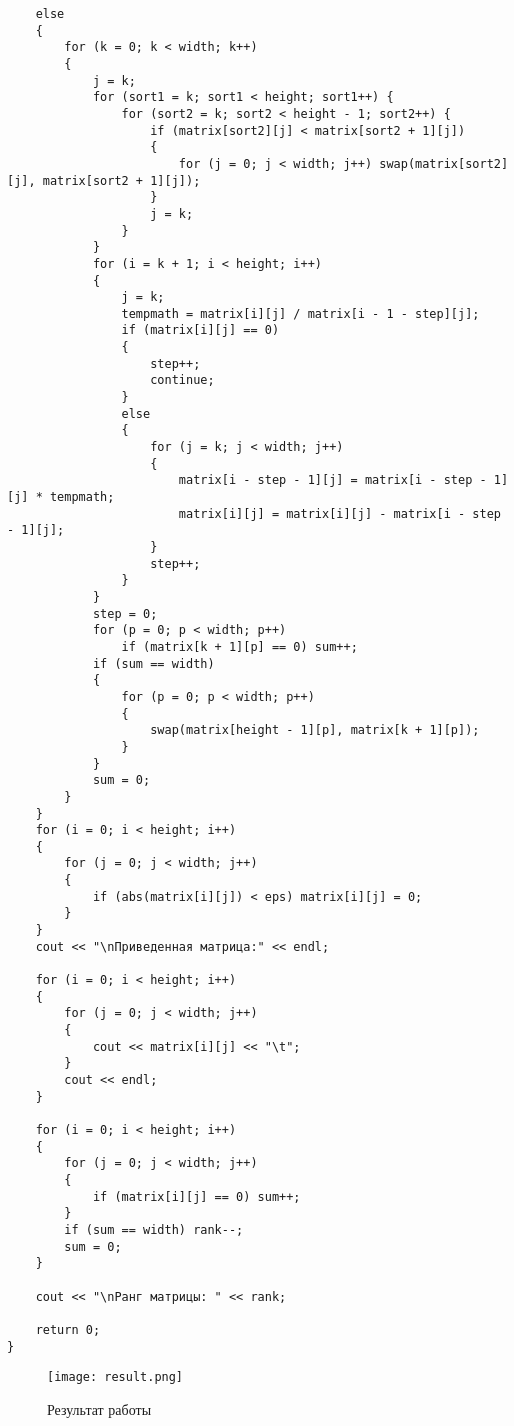 \documentclass[12pt,a4paper]{scrartcl}
\begin{document}
\begin{verbatim}
	else
	{
		for (k = 0; k < width; k++)
		{
			j = k;
			for (sort1 = k; sort1 < height; sort1++) {
				for (sort2 = k; sort2 < height - 1; sort2++) {
					if (matrix[sort2][j] < matrix[sort2 + 1][j])
					{
						for (j = 0; j < width; j++) swap(matrix[sort2][j], matrix[sort2 + 1][j]);
					}
					j = k;
				}
			}
			for (i = k + 1; i < height; i++)
			{
				j = k;
				tempmath = matrix[i][j] / matrix[i - 1 - step][j];
				if (matrix[i][j] == 0)
				{
					step++;
					continue;
				}
				else
				{
					for (j = k; j < width; j++)
					{
						matrix[i - step - 1][j] = matrix[i - step - 1][j] * tempmath;
						matrix[i][j] = matrix[i][j] - matrix[i - step - 1][j];
					}
					step++;
				}
			}
			step = 0;
			for (p = 0; p < width; p++)
				if (matrix[k + 1][p] == 0) sum++;
			if (sum == width)
			{
				for (p = 0; p < width; p++)
				{
					swap(matrix[height - 1][p], matrix[k + 1][p]);
				}
			}
			sum = 0;
		}
	}
	for (i = 0; i < height; i++)
	{
		for (j = 0; j < width; j++)
		{
			if (abs(matrix[i][j]) < eps) matrix[i][j] = 0;
		}
	}
	cout << "\nПриведенная матрица:" << endl;
 
	for (i = 0; i < height; i++)
	{
		for (j = 0; j < width; j++)
		{
			cout << matrix[i][j] << "\t";
		}
		cout << endl;
	}
 
	for (i = 0; i < height; i++)
	{
		for (j = 0; j < width; j++)
		{
			if (matrix[i][j] == 0) sum++;
		}
		if (sum == width) rank--;
		sum = 0;
	}

	cout << "\nРанг матрицы: " << rank;

	return 0;
}	

\end{verbatim}

\begin{figure}[h]
 \centering
 \texttt{[image: result.png]}
 \caption{Результат работы}\label{fig:par}
\end{figure}
\end{document}

